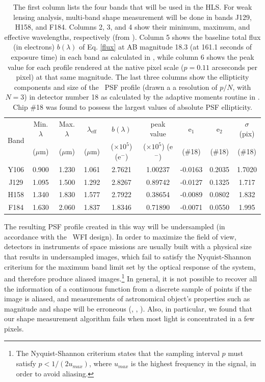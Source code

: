 \documentclass[11pt,preprint,flushrt]{aastex}
\begin{document}
\begin{table}[!htb]
\centering
\begin{tabular}{ |c| c | c| c| c| c| c | c| c|}
\hline
\multirow{2}{*}{Band} & Min. $\lambda$ & Max. $\lambda$ & $\lambda_{\text{eff}}$ & $b(\lambda)$ & peak value  & e$_1$ & e$_2$ & $\sigma$ (pix) \\
& ($\mu$m) & ($\mu$m) & ($\mu$m) & ($\times10^5$) (e$^{-}$) & ($\times 10^{5}$) (e$^{-}$) & (\#18) & (\#18) & (\#18)  \\
\hline 
Y106 & 0.900 & 1.230 & 1.061 & 2.7621 &  1.00237  &-0.0163  & 0.2035 & 1.7020 \\
J129  & 1.095 & 1.500 & 1.292 & 2.8267 &  0.89742 & -0.0127  & 0.1325 & 1.717 \\
H158 & 1.340 & 1.830 & 1.577 & 2.7922 &  0.38654 & -0.0089 & 0.0802 & 1.832 \\
F184 & 1.630 & 2.060 & 1.837 & 1.8346 &  0.71890 & -0.0071 & 0.0550 & 1.995 \\
\hline
\end{tabular}
\caption{The first column lists the four bands that will be used in the HLS. For weak lensing analysis, multi-band shape measurement will be done in bands J129, H158, and F184. Columns 2, 3, and 4 show their minimum, maximum, and effective wavelengths, respectively (from \citealt{kannawadi15}). Column 5 shows the baseline total flux (in electrons) $b(\lambda)$ of Eq. \ref{flux} at AB magnitude 18.3 (at 161.1 seconds of exposure time) in each band as calculated in \gs, while column 6 shows the peak value for each profile rendered at the native pixel scale ($p=0.11$ arcseconds per pixel) at that same magnitude. The last three columns show the ellipticity components and size of the \wfa\ PSF profile (drawn a a resolution of $p/N$, with $N=3$) in detector number 18 as calculated by the adaptive moments routine in \gs. Chip \#18 was found to possess the largest values of absolute PSF ellipticity.}
\label{table1}
\end{table}

The resulting PSF profile created in this way will be undersampled (in accordance with the \wfa\ WFI design). In order to maximize the field of view, detectors in instruments of space missions are usually built with a physical size that results in undersampled images, which fail to satisfy the Nyquist-Shannon criterium for the maximum band limit set by the optical response of the system, and therefore produce aliased images.\footnote{The Nyquist-Shannon criterium states that the sampling interval $p$ must satisfy $p < 1/(2 u_{max})$, where $u_{max}$ is the highest frequency in the signal, in order to avoid aliasing.} In general, it is not possible to recover all the information of a continuous function from a discrete sample of points if the image is aliased, and measurements of astronomical object's properties such as magnitude and shape will be erroneous (\citealt{lauer99a}, \citealt{fruchter11}, \citealt{rhodes07}). Also, in particular, we found that our shape measurement algorithm fails when most light is concentrated in a few pixels.
\end{document}

